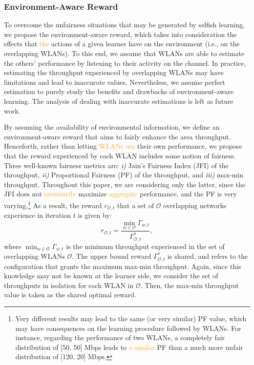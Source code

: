 \documentclass[preprint,12pt]{elsarticle}
\begin{document}
\subsubsection{Environment-Aware Reward}
\label{subsubsection:informed_learning}
To overcome the unfairness situations that may be generated by selfish learning, we propose the environment-aware reward, which takes into consideration the effects that \textcolor{orange}{the} actions of a given learner have on the environment (i.e., on the overlapping WLANs). To this end, we assume that WLANs are able to estimate the others' performance by listening to their activity on the channel. In practice, estimating the throughput experienced by overlapping WLANs may have limitations and lead to inaccurate values. Nevertheless, we assume perfect estimation to purely study the benefits and drawbacks of environment-aware learning. The analysis of dealing with inaccurate estimations is left as future work.

By assuming the availability of environmental information, we define an environment-aware reward that aims to fairly enhance the area throughput. Henceforth, rather than letting \textcolor{orange}{WLANs use} their own performance, we propose that the reward experienced by each WLAN includes some notion of fairness. Three well-known fairness metrics are: \emph{i)} Jain's Fairness Index (JFI) of the throughput, \emph{ii)} Proportional Fairness (PF) of the throughput, and \emph{iii)} max-min throughput. Throughout this paper, we are considering only the latter, since the JFI does not \textcolor{orange}{necessarily} maximize \textcolor{orange}{aggregate} performance, and the PF is very varying.\footnote{Very different results may lead to the same (or very similar) PF value, which may have consequences on the learning procedure followed by WLANs. For instance, regarding the performance of two WLANs, a completely fair distribution of [50, 50] Mbps leads to \textcolor{orange}{a similar} PF than a much more unfair distribution of [120, 20] Mbps.} As a result, the reward $r_{\mathcal{O},t}$ that a set of $\mathcal{O}$ overlapping networks experience in iteration $t$ is given by:
\begin{equation}
	r_{\mathcal{O},t} =\frac{\min_{w \in \mathcal{O}} \Gamma_{w,t}}{\Gamma_{\mathcal{O},t}^*}, 
	\nonumber
\end{equation}			
where $\min_{w \in \mathcal{O}} \Gamma_{w,t}$ is the minimum throughput experienced in the set of overlapping WLANs $\mathcal{O}$. The upper bound reward $\Gamma_{\mathcal{O},t}^*$ is shared, and refers to the configuration that grants the maximum max-min throughput. Again, since this knowledge may not be known at the learner side, we consider the set of throughputs in isolation for each WLAN in $\mathcal{O}$. Then, the max-min throughput value is taken as the shared optimal reward.
\end{document}
